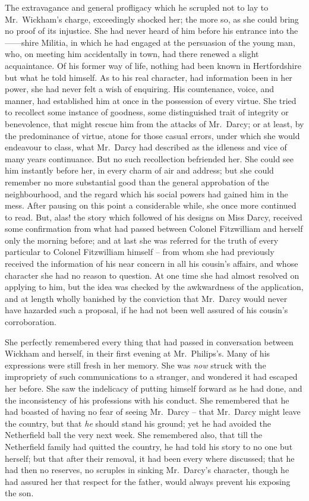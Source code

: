 The extravagance and general profligacy which he
scrupled not to lay to Mr.\ Wickham’s charge, exceedingly
shocked her; the more so, as she could bring no proof
of its injustice. She had never heard of him before his
entrance into the ------shire Militia, in which he had
engaged at the persuasion of the young man, who, on
meeting him accidentally in town, had there renewed
a slight acquaintance. Of his former way of life, nothing
had been known in Hertfordshire but what he told himself.
As to his real character, had information been in her
power, she had never felt a wish of enquiring. His countenance,
voice, and manner, had established him at once
in the possession of every virtue. She tried to recollect
some instance of goodness, some distinguished trait of
integrity or benevolence, that might rescue him from
the attacks of Mr.\ Darcy; or at least, by the predominance
of virtue, atone for those casual errors, under which she
would endeavour to class, what Mr.\ Darcy had described
as the idleness and vice of many years continuance.
But no such recollection befriended her. She could see
him instantly before her, in every charm of air and address;
but she could remember no more substantial good than
the general approbation of the neighbourhood, and the
regard which his social powers had gained him in the mess.
After pausing on this point a considerable while, she once
more continued to read. But, alas! the story which
followed of his designs on Miss Darcy, received some
confirmation from what had passed between Colonel
Fitzwilliam and herself only the morning before; and at
last she was referred for the truth of every particular to
Colonel Fitzwilliam himself -- from whom she had previously
received the information of his near concern in all his
cousin’s affairs, and whose character she had no reason
to question. At one time she had almost resolved on
applying to him, but the idea was checked by the awkwardness
of the application, and at length wholly banished
by the conviction that Mr.\ Darcy would never have
hazarded such a proposal, if he had not been well assured
of his cousin’s corroboration.

She perfectly remembered every thing that had passed
in conversation between Wickham and herself, in their
first evening at Mr.\ Philips’s. Many of his expressions
were still fresh in her memory. She was \textit{now} struck with
the impropriety of such communications to a stranger,
and wondered it had escaped her before. She saw the
indelicacy of putting himself forward as he had done,
and the inconsistency of his professions with his conduct.
She remembered that he had boasted of having no fear
of seeing Mr.\ Darcy -- that Mr.\ Darcy might leave the
country, but that \textit{he} should stand his ground; yet he
had avoided the Netherfield ball the very next week.
She remembered also, that till the Netherfield family had
quitted the country, he had told his story to no one but
herself; but that after their removal, it had been every
where discussed; that he had then no reserves, no scruples
in sinking Mr.\ Darcy’s character, though he had assured
her that respect for the father, would always prevent his
exposing the son.


